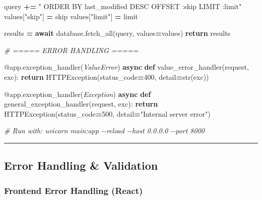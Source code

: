 \documentclass[
]{article}
\newenvironment{Shaded}{\begin{snugshade}}{\end{snugshade}}
\newcommand{\AttributeTok}[1]{\textcolor[rgb]{0.13,0.29,0.53}{#1}}
\newcommand{\BuiltInTok}[1]{#1}
\newcommand{\CommentTok}[1]{\textcolor[rgb]{0.56,0.35,0.01}{\textit{#1}}}
\newcommand{\ControlFlowTok}[1]{\textcolor[rgb]{0.13,0.29,0.53}{\textbf{#1}}}
\newcommand{\DecValTok}[1]{\textcolor[rgb]{0.00,0.00,0.81}{#1}}
\newcommand{\KeywordTok}[1]{\textcolor[rgb]{0.13,0.29,0.53}{\textbf{#1}}}
\newcommand{\NormalTok}[1]{#1}
\newcommand{\OperatorTok}[1]{\textcolor[rgb]{0.81,0.36,0.00}{\textbf{#1}}}
\newcommand{\PreprocessorTok}[1]{\textcolor[rgb]{0.56,0.35,0.01}{\textit{#1}}}
\newcommand{\StringTok}[1]{\textcolor[rgb]{0.31,0.60,0.02}{#1}}
\begin{document}
\begin{Shaded}
\begin{Highlighting}[]
\NormalTok{    query }\OperatorTok{+=} \StringTok{" ORDER BY last\_modified DESC OFFSET :skip LIMIT :limit"}
\NormalTok{    values[}\StringTok{"skip"}\NormalTok{] }\OperatorTok{=}\NormalTok{ skip}
\NormalTok{    values[}\StringTok{"limit"}\NormalTok{] }\OperatorTok{=}\NormalTok{ limit}

\NormalTok{    results }\OperatorTok{=} \ControlFlowTok{await}\NormalTok{ database.fetch\_all(query, values}\OperatorTok{=}\NormalTok{values)}
    \ControlFlowTok{return}\NormalTok{ results}

\CommentTok{\# ===== ERROR HANDLING =====}

\AttributeTok{@app.exception\_handler}\NormalTok{(}\PreprocessorTok{ValueError}\NormalTok{)}
\ControlFlowTok{async} \KeywordTok{def}\NormalTok{ value\_error\_handler(request, exc):}
    \ControlFlowTok{return}\NormalTok{ HTTPException(status\_code}\OperatorTok{=}\DecValTok{400}\NormalTok{, detail}\OperatorTok{=}\BuiltInTok{str}\NormalTok{(exc))}

\AttributeTok{@app.exception\_handler}\NormalTok{(}\PreprocessorTok{Exception}\NormalTok{)}
\ControlFlowTok{async} \KeywordTok{def}\NormalTok{ general\_exception\_handler(request, exc):}
    \ControlFlowTok{return}\NormalTok{ HTTPException(status\_code}\OperatorTok{=}\DecValTok{500}\NormalTok{, detail}\OperatorTok{=}\StringTok{"Internal server error"}\NormalTok{)}

\CommentTok{\# Run with: uvicorn main:app {-}{-}reload {-}{-}host 0.0.0.0 {-}{-}port 8000}
\end{Highlighting}
\end{Shaded}

\begin{center}\rule{0.5\linewidth}{0.5pt}\end{center}

\hypertarget{error-handling-validation}{%
\subsection{Error Handling \&
Validation}\label{error-handling-validation}}

\hypertarget{frontend-error-handling-react}{%
\subsubsection{Frontend Error Handling
(React)}\label{frontend-error-handling-react}}
\end{document}
